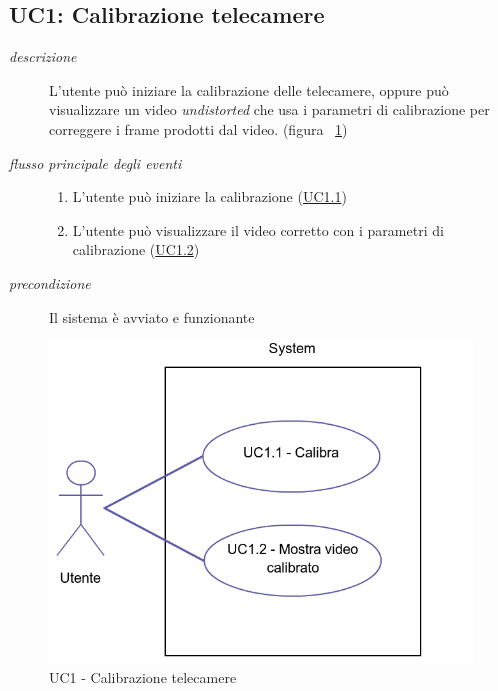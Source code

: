 \subsection{UC1: Calibrazione telecamere} \label{sec:uc1}
\begin{description}
 \item[\em{descrizione}] L'utente può iniziare la calibrazione delle telecamere, oppure può visualizzare un video \textit{undistorted} che usa i parametri di calibrazione per correggere i frame prodotti dal video. (figura ~\ref{fig:uc1})
 \item[\em{flusso principale degli eventi}] \mbox{}
 \begin{enumerate}
	\item L'utente può iniziare la calibrazione (\hyperref[sec:uc1.1]{UC1.1}) 
	\item L'utente può visualizzare il video corretto con i parametri di calibrazione (\hyperref[sec:uc1.2]{UC1.2})
\end{enumerate} 
 \item[\em{precondizione}] Il sistema è avviato e funzionante

\end{description}
 
\begin{figure}[htpb]
\centering
\includegraphics[scale=0.4]{./images/uc1.png}
\caption{UC1 - Calibrazione telecamere}
\label{fig:uc1}
\end{figure} 


